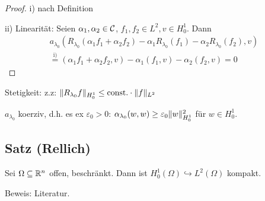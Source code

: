 \begin{proof}
  i) nach Definition

  ii) Linearität: Seien $\alpha_1, \alpha_2 \in \mathcal{C}$, $f_1,f_2 \in L^2, v \in H_0^1$. Dann
  \begin{align*}
  a_{\lambda_0}(R_{\lambda_0}(\alpha_1 f_1 + \alpha_2 f_2) - \alpha_1 R_{\lambda_0}(f_1) - \alpha_2 R_{\lambda_0}(f_2), v) \\
  \overset{\text{i)}}{=} (\alpha_1 f_1 + \alpha_2 f_2, v) - \alpha_1 (f_1, v) - \alpha_2(f_2, v) = 0 
  \end{align*}
\end{proof}

  Stetigkeit: z.z: $\lVert R_{\lambda_0} f \rVert_{H_0^1} \leq \text{const.} \cdot \lVert f \rVert_{L^2}$

  $a_{\lambda_0}$ koerziv, d.h. es ex $\varepsilon_0 > 0$: $\alpha_{\lambda_0}(w,w) \geq \varepsilon_0 \lVert w \rVert_{H_0^1}^2$ für $w \in H_0^1$.

\subsection{Satz (Rellich)}

Sei $\Omega \subseteq \mathbb{R}^n$ offen, beschränkt. Dann ist $H_0^1(\Omega) \hookrightarrow L^2(\Omega)$ kompakt.

Beweis: Literatur.
